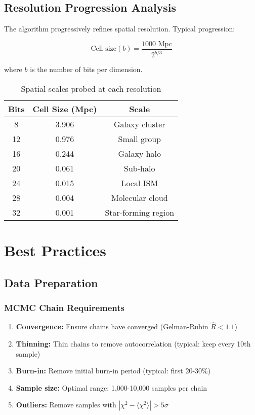 \documentclass[11pt]{article}
\begin{document}
\subsection{Resolution Progression Analysis}

The algorithm progressively refines spatial resolution. Typical progression:

\begin{equation}
\text{Cell size}(b) = \frac{1000 \text{ Mpc}}{2^{b/3}}
\end{equation}

where $b$ is the number of bits per dimension.

\begin{table}[h]
\centering
\begin{tabular}{@{}ccc@{}}
\toprule
\textbf{Bits} & \textbf{Cell Size (Mpc)} & \textbf{Scale} \\ \midrule
8 & 3.906 & Galaxy cluster \\
12 & 0.976 & Small group \\
16 & 0.244 & Galaxy halo \\
20 & 0.061 & Sub-halo \\
24 & 0.015 & Local ISM \\
28 & 0.004 & Molecular cloud \\
32 & 0.001 & Star-forming region \\ \bottomrule
\end{tabular}
\caption{Spatial scales probed at each resolution}
\label{tab:resolutions}
\end{table}

\section{Best Practices}

\subsection{Data Preparation}

\subsubsection{MCMC Chain Requirements}
\begin{enumerate}
    \item \textbf{Convergence:} Ensure chains have converged (Gelman-Rubin $\hat{R} < 1.1$)
    \item \textbf{Thinning:} Thin chains to remove autocorrelation (typical: keep every 10th sample)
    \item \textbf{Burn-in:} Remove initial burn-in period (typical: first 20-30\%)
    \item \textbf{Sample size:} Optimal range: 1,000-10,000 samples per chain
    \item \textbf{Outliers:} Remove samples with $|\chi^2 - \langle\chi^2\rangle| > 5\sigma$
\end{enumerate}
\end{document}
